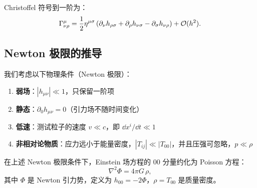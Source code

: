 Christoffel 符号到一阶为：
\begin{equation}
    \Gamma^\mu_{\nu\rho} = \frac{1}{2}\eta^{\mu\sigma}\left(\partial_\nu h_{\rho\sigma} + \partial_\rho h_{\nu\sigma} - \partial_\sigma h_{\nu\rho}\right) + \mathcal{O}(h^2).
    \label{eq:linear_Christoffel}
\end{equation}

\subsection{Newton 极限的推导}

我们考虑以下物理条件（Newton 极限）：
\begin{enumerate}
    \item \textbf{弱场}：$|h_{\mu\nu}| \ll 1$，只保留一阶项
    \item \textbf{静态}：$\partial_0 h_{\mu\nu} = 0$（引力场不随时间变化）
    \item \textbf{低速}：测试粒子的速度 $v \ll c$，即 $\dd x^i/\dd t \ll 1$
    \item \textbf{非相对论物质}：应力远小于能量密度，$|T_{ij}| \ll |T_{00}|$，并且压强可忽略，$p \ll \rho$
\end{enumerate}

\begin{theorem}
在上述 Newton 极限条件下，Einstein 场方程的 $00$ 分量约化为 Poisson 方程：
\begin{equation}
    \boxed{\nabla^2 \Phi = 4\pi G \,\rho},
    \label{eq:poisson}
\end{equation}
其中 $\Phi$ 是 Newton 引力势，定义为 $h_{00} = -2\Phi$，$\rho = T_{00}$ 是质量密度。
\end{theorem}

